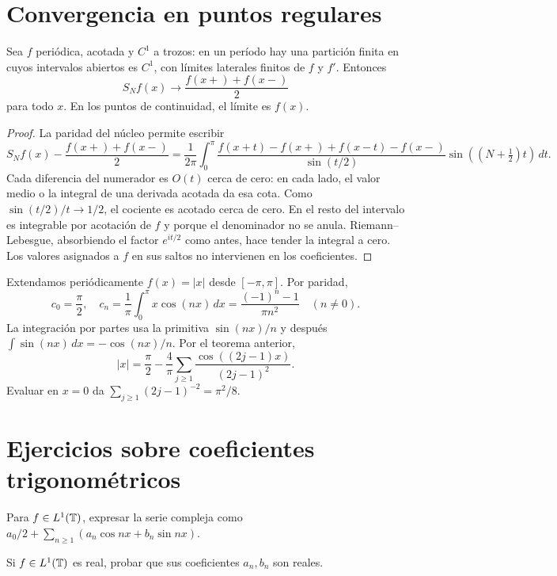 \section{Convergencia en puntos regulares}
\begin{teorema}\label{v4:dirichlet-puntual}
Sea $f$ periódica, acotada y $C^1$ a trozos: en un período hay una partición finita en cuyos intervalos abiertos es $C^1$, con límites laterales finitos de $f$ y $f'$. Entonces
\[
 S_Nf(x)\longrightarrow\frac{f(x+)+f(x-)}2
\]
para todo $x$. En los puntos de continuidad, el límite es $f(x)$.
\end{teorema}
\begin{proof}
La paridad del núcleo permite escribir
\[
 S_Nf(x)-\frac{f(x+)+f(x-)}2
 =\frac1{2\pi}\int_0^\pi
 \frac{f(x+t)-f(x+)+f(x-t)-f(x-)}{\sin(t/2)}
 \sin((N+\tfrac12)t)\,dt.
\]
Cada diferencia del numerador es $O(t)$ cerca de cero: en cada lado, el valor medio o la integral de una derivada acotada da esa cota. Como $\sin(t/2)/t\to1/2$, el cociente es acotado cerca de cero. En el resto del intervalo es integrable por acotación de $f$ y porque el denominador no se anula. Riemann--Lebesgue, absorbiendo el factor $e^{it/2}$ como antes, hace tender la integral a cero. Los valores asignados a $f$ en sus saltos no intervienen en los coeficientes.
\end{proof}
\begin{ejemplo}[La función $|x|$]
Extendamos periódicamente $f(x)=|x|$ desde $[-\pi,\pi]$. Por paridad,
\[
 c_0=\frac\pi2,\quad
 c_n=\frac1\pi\int_0^\pi x\cos(nx)\,dx
 =\frac{(-1)^n-1}{\pi n^2}\quad(n\ne0).
\]
La integración por partes usa la primitiva $\sin(nx)/n$ y después $\int\sin(nx)\,dx=-\cos(nx)/n$. Por el teorema anterior,
\[
 |x|=\frac\pi2-\frac4\pi\sum_{j\geq1}\frac{\cos((2j-1)x)}{(2j-1)^2}.
\]
Evaluar en $x=0$ da $\sum_{j\geq1}(2j-1)^{-2}=\pi^2/8$.
\end{ejemplo}

\section{Ejercicios sobre coeficientes trigonométricos}
\begin{ejercicio}\label{ej:v4-l04-1}
Para $f\in L^1(\mathbb T)$, expresar la serie compleja como $a_0/2+\sum_{n\geq1}(a_n\cos nx+b_n\sin nx)$.
\end{ejercicio}

\begin{ejercicio}\label{ej:v4-l04-2}
Si $f\in L^1(\mathbb T)$ es real, probar que sus coeficientes $a_n,b_n$ son reales.
\end{ejercicio}


